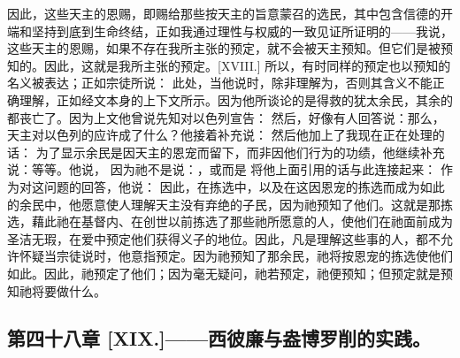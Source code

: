 因此，这些天主的恩赐，即赐给那些按天主的旨意蒙召的选民，其中包含信德的开端和坚持到底到生命终结，正如我通过理性与权威的一致见证所证明的——我说，这些天主的恩赐，如果不存在我所主张的预定，就不会被天主预知。但它们是被预知的。因此，这就是我所主张的预定。[XVIII.] 所以，有时同样的预定也以预知的名义被表达；正如宗徒所说：  此处，当他说时，除非理解为，否则其含义不能正确理解，正如经文本身的上下文所示。因为他所谈论的是得救的犹太余民，其余的都丧亡了。因为上文他曾说先知对以色列宣告： 然后，好像有人回答说：那么，天主对以色列的应许成了什么？他接着补充说： 然后他加上了我现在正在处理的话：  为了显示余民是因天主的恩宠而留下，而非因他们行为的功绩，他继续补充说：等等。他说，  因为祂不是说：，或而是  将他上面引用的话与此连接起来： 作为对这问题的回答，他说：  因此，在拣选中，以及在这因恩宠的拣选而成为如此的余民中，他愿意使人理解天主没有弃绝的子民，因为祂预知了他们。这就是那拣选，藉此祂在基督内、在创世以前拣选了那些祂所愿意的人，使他们在祂面前成为圣洁无瑕，在爱中预定他们获得义子的地位。因此，凡是理解这些事的人，都不允许怀疑当宗徒说时，他意指预定。因为祂预知了那余民，祂将按恩宠的拣选使他们如此。因此，祂预定了他们；因为毫无疑问，祂若预定，祂便预知；但预定就是预知祂将要做什么。\par


\subsection{第四十八章 [XIX.]——西彼廉与盎博罗削的实践。}

